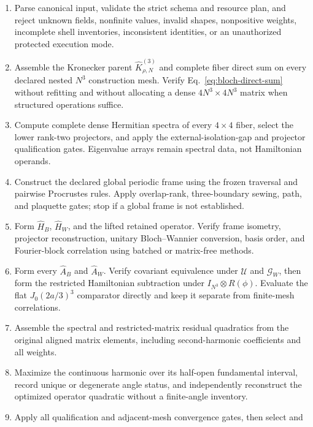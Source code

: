 \documentclass[11pt]{article}
\begin{document}
\begin{enumerate}[label=\arabic*.]
 \item Parse canonical input, validate the strict schema and resource plan, and reject
       unknown fields, nonfinite values, invalid shapes, nonpositive weights, incomplete
       shell inventories, inconsistent identities, or an unauthorized protected
       execution mode.
 \item Assemble the Kronecker parent $\widehat K_{\rho,N}^{(3)}$ and complete fiber
       direct sum on every declared nested $N^3$ construction mesh. Verify
       Eq.~\eqref{eq:bloch-direct-sum} without refitting and without allocating a dense
       $4N^3\times4N^3$ matrix when structured operations suffice.
 \item Compute complete dense Hermitian spectra of every $4\times4$ fiber, select the
       lower rank-two projectors, and apply the external-isolation-gap and projector qualification
       gates. Eigenvalue arrays remain spectral data, not Hamiltonian operands.
 \item Construct the declared global periodic frame using the frozen traversal and
       pairwise Procrustes rules. Apply overlap-rank, three-boundary sewing, path, and
       plaquette gates; stop if a global frame is not established.
 \item Form $\widehat H_B$, $\widehat H_W$, and the lifted retained operator. Verify
       frame isometry, projector reconstruction, unitary Bloch--Wannier conversion,
       basis order, and Fourier-block correlation using batched or matrix-free methods.
 \item Form every $\widehat A_B$ and $\widehat A_W$. Verify covariant equivalence under
       $\mathcal U$ and $\mathcal G_W$, then form the restricted Hamiltonian subtraction
       under $I_{N^3}\otimes R(\phi)$. Evaluate the flat $J_0(2a/3)^3$ comparator
       directly and keep it separate from finite-mesh correlations.
 \item Assemble the spectral and restricted-matrix residual quadratics from the original
       aligned matrix elements, including second-harmonic coefficients and all weights.
 \item Maximize the continuous harmonic over its half-open fundamental interval, record
       unique or degenerate angle status, and independently reconstruct the optimized
       operator quadratic without a finite-angle inventory.
 \item Apply all qualification and adjacent-mesh convergence gates, then select and

\end{enumerate}
\end{document}
